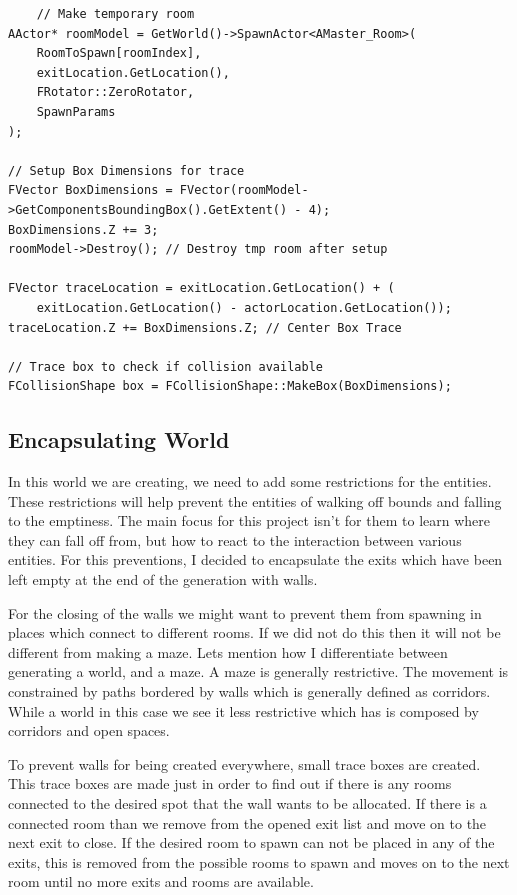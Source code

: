 \documentclass[10pt, letterpaper]{article}
\begin{document}
\begin{Form}
	\begin{framed}
		\begin{verbatim}
    // Make temporary room
AActor* roomModel = GetWorld()->SpawnActor<AMaster_Room>(
    RoomToSpawn[roomIndex],
    exitLocation.GetLocation(),
    FRotator::ZeroRotator,
    SpawnParams
);

// Setup Box Dimensions for trace
FVector BoxDimensions = FVector(roomModel->GetComponentsBoundingBox().GetExtent() - 4);
BoxDimensions.Z += 3;
roomModel->Destroy(); // Destroy tmp room after setup

FVector traceLocation = exitLocation.GetLocation() + (
    exitLocation.GetLocation() - actorLocation.GetLocation());
traceLocation.Z += BoxDimensions.Z; // Center Box Trace

// Trace box to check if collision available
FCollisionShape box = FCollisionShape::MakeBox(BoxDimensions);
        \end{verbatim}
	\end{framed}

	\subsection{Encapsulating World}

	In this world we are creating, we need to add some restrictions for the entities. These restrictions will help prevent
	the entities of walking off bounds and falling to the emptiness. The main focus for this project isn't for them to learn
	where they can fall off from, but how to react to the interaction between various entities. For this preventions, I
	decided to encapsulate the exits which have been left empty at the end of the generation with walls.

	For the closing of the walls we might want to prevent them from spawning in places which connect to different rooms.
	If we did not do this then it will not be different from making a maze. Lets mention how I differentiate between
	generating a world, and a maze. A maze is generally restrictive. The movement is constrained by paths bordered by
	walls which is generally defined as corridors. While a world in this case we see it less restrictive which has is
	composed by corridors and open spaces.

	To prevent walls for being created everywhere, small trace boxes are created. This trace boxes are made just in order
	to find out if there is any rooms connected to the desired spot that the wall wants to be allocated. If there is a
	connected room than we remove from the opened exit list and move on to the next exit to close. If the desired room
	to spawn can not be placed in any of the exits, this is removed from the possible rooms to spawn and moves on to the
	next room until no more exits and rooms are available.


\end{Form}
\end{document}
